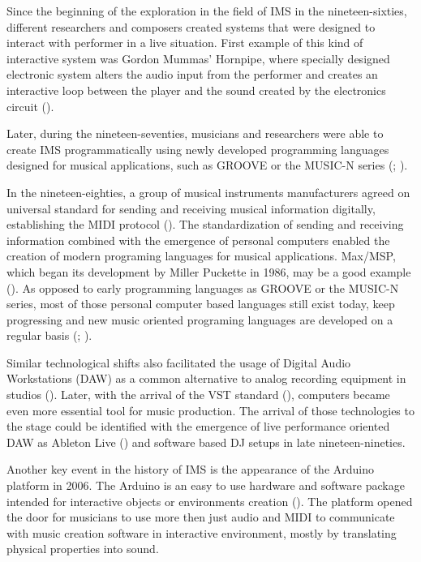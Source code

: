\documentclass[a4paper,11pt]{article}
\begin{document}
Since the beginning of the exploration in the field of IMS in the nineteen-sixties, different researchers and composers created systems that were designed to interact with performer in a live situation.
First example of this kind of interactive system was Gordon Mummas' Hornpipe, where specially designed electronic system alters the audio input from the performer and creates an interactive loop between the player and the sound created by the electronics circuit (\cite[p. 12]{winkler01}).

Later, during the nineteen-seventies, musicians and researchers were able to create IMS programmatically using newly developed programming languages designed for musical applications, such as GROOVE or the MUSIC-N series (\cite{mathews70}; \cite{mathews69}).

In the nineteen-eighties, a group of musical instruments manufacturers agreed on universal standard for sending and receiving musical information digitally, establishing the MIDI protocol (\cite{web:quinn}).
The standardization of sending and receiving information combined with the emergence of personal computers enabled the creation of modern programing languages for musical applications.
Max/MSP, which began its development by Miller Puckette in 1986, may be a good example (\cite[p. 16]{winkler01}).
As opposed to early programming languages as GROOVE or the MUSIC-N series, most of those personal computer based languages still exist today, keep progressing and new music oriented programing languages are developed on a regular basis (\citeauthor{web:chuck}; \citeauthor{web:usine}).

Similar technological shifts also facilitated the usage of Digital Audio Workstations (DAW) as a common alternative to analog recording equipment in studios (\cite{leider:04}).
Later, with the arrival of the VST standard (\citeauthor{web:steinberg}), computers became even more essential tool for music production.
The arrival of those technologies to the stage could be identified with the emergence of live performance oriented DAW as Ableton Live (\citeauthor{web:live}) and software based DJ setups in late nineteen-nineties.

Another key event in the history of IMS is the appearance of the Arduino platform in 2006.
The Arduino is an easy to use hardware and software package intended for interactive objects or environments creation (\citeauthor{web:arduino}).
The platform opened the door for musicians to use more then just audio and MIDI to communicate with music creation software in interactive environment, mostly by translating physical properties into sound.
\end{document}
